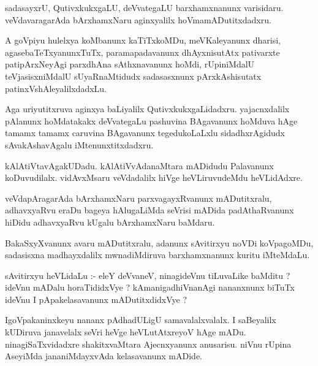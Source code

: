 \documentclass{article}
\begin{document}
\begin{mn}
sadasayxrU, QutivxkukxgaLU, deVvategaLU barxhamxnanunx varisidaru.  veVdavaragarAda  
bArxhamxNaru aginxyalilx hoVmamADutitxdadxru.
\end{mn}

\begin{mn}
A goVpiyu  hulelxya koMbanunx  kaTiTxkoMDu, meVKaleyanunx  dharisi, agasebaTeTxyanunxTuTx, 
paramapadavanunx  dhAyxnisutAtx pativarxte patipArxNeyAgi parxdhAna sAthxnavanunx  hoMdi, 
rUpiniMdalU teVjasisxniMdalU  sUyaRnaMtidudx sadasasxnunx pArxkAshisutatx  patinxVshAleyalilxdadxLu.
\end{mn}

\begin{mn}
Aga  uriyutitxruva  aginxya baLiyalilx  QutivxkukxgaLidadxru.  yajacnxdalilx pAlanunx 
hoMdatakakx  deVvategaLu  pashuvina BAgavanunx  hoMduva hAge tamamx tamamx caruvina 
BAgavanunx tegedukoLaLxlu  sidadhxrAgidudx sAvakAshavAgalu iMtenunxtitxdadxru.
\end{mn}

\begin{mn}
kAlAtiVtavAgakUDadu.  kAlAtiVvAdanaMtara  mADidudu Palavanunx koDuvudilalx.  
vidAvxMsaru veVdadalilx  hiVge  heVLiruvudeMdu heVLidAdxre.
\end{mn}

\begin{mn}
veVdapAragarAda  bArxhamxNaru parxvagayxRvanunx  mADutitxralu, adhavxyaRvu  eraDu  bageya  
hAlugaLiMda  seVrisi mADida  padAthaRvanunx hiDidu adhavxyaRvu kUgalu bArxhamxNaru baMdaru.
\end{mn}

\begin{mn}
BakaSxyXvanunx avaru mADutitxralu,  adanunx  sAvitirxyu  noVDi  koVpagoMDu,  sadasisxna  
madhayxdalilx  mwnadiMdiruva  barxhamxnanunx kuritu iMteMdaLu.
\end{mn}

\begin{mn}
sAvitirxyu  heVLidaLu :- eleY deVvaneV, ninagideVnu tiLuvaLike baMditu ?  ideVnu  mADalu  horaTididxVye ?  
kAmanigadhiVnanAgi nananxnunx biTuTx ideVnu I pApakelasavanunx  mADutitxdidxVye ?
\end{mn}

\begin{mn}
IgoVpakaninxkeyu nananx pAdhadULigU  samavalalxvalalx. I saBeyalilx kUDiruva 
janavelalx seVri heVge heVLutAtxreyoV  hAge mADu.  ninagiSaTxvidadxre  shakitxvaMtara  
Ajecnxyanunx  anusarisu.  niVnu  rUpina  AseyiMda  jananiMdayxvAda kelasavanunx mADide.
\end{mn}
\end{document}
